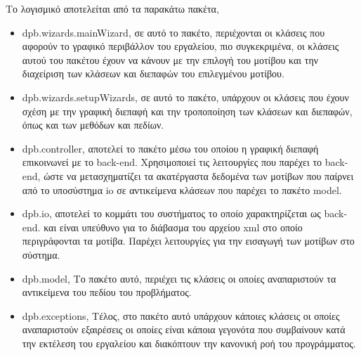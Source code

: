 Το λογισμικό αποτελείται από τα παρακάτω πακέτα,
\begin{itemize}
    \item dpb.wizards.mainWizard, σε αυτό το πακέτο, περιέχονται οι κλάσεις που αφορούν το γραφικό περιβάλλον του εργαλείου,
     πιο συγκεκριμένα, οι κλάσεις αυτού του πακέτου έχουν να κάνουν με την επιλογή του μοτίβου και την διαχείριση των κλάσεων και διεπαφών του 
     επιλεγμένου μοτίβου.
    \item dpb.wizards.setupWizards, σε αυτό το πακέτο, υπάρχουν οι κλάσεις που έχουν σχέση με την γραφική διεπαφή και την τροποποίηση των κλάσεων και διεπαφών, 
    όπως και των μεθόδων και πεδίων.
    \item dpb.controller, αποτελεί το πακέτο μέσω του οποίου η γραφική διεπαφή επικοινωνεί με το back-end. Χρησιμοποιεί τις λειτουργίες που παρέχει το back-end, 
    ώστε να  μετασχηματίζει τα ακατέργαστα δεδομένα των μοτίβων που παίρνει από το υποσύστημα io σε αντικείμενα κλάσεων που παρέχει το πακέτο model.
    \item dpb.io, αποτελεί το κομμάτι του συστήματος το οποίο χαρακτηρίζεται ως back-end.
     και είναι υπεύθυνο για το διάβασμα του αρχείου xml στο οποίο περιγράφονται τα μοτίβα. 
     Παρέχει λειτουργίες για την εισαγωγή των μοτίβων στο σύστημα.
    \item dpb.model, Το πακέτο αυτό, περιέχει τις κλάσεις οι οποίες αναπαριστούν τα αντικείμενα του πεδίου του προβλήματος.
    \item dpb.exceptions, Τέλος, στο πακέτο αυτό υπάρχουν κάποιες κλάσεις οι οποίες αναπαριστούν εξαιρέσεις 
        οι οποίες είναι κάποια γεγονότα που συμβαίνουν κατά την εκτέλεση του εργαλείου και διακόπτουν την κανονική ροή του προγράμματος.
\end{itemize}

